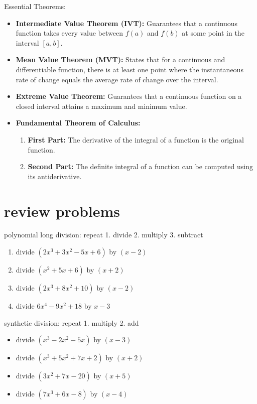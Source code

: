 \documentclass{article}
\begin{document}
Essential Theorems:
\begin{itemize}
    \item \textbf{Intermediate Value Theorem (IVT):} Guarantees that a continuous function takes every value between \( f(a) \) and \( f(b) \) at some point in the interval \([a, b]\).
    \item \textbf{Mean Value Theorem (MVT):} States that for a continuous and differentiable function, there is at least one point where the instantaneous rate of change equals the average rate of change over the interval.
    \item \textbf{Extreme Value Theorem:} Guarantees that a continuous function on a closed interval attains a maximum and minimum value.
    \item \textbf{Fundamental Theorem of Calculus:}
    \begin{enumerate}
        \item \textbf{First Part:} The derivative of the integral of a function is the original function.
        \item \textbf{Second Part:} The definite integral of a function can be computed using its antiderivative.
    \end{enumerate}
\end{itemize}

\newpage
\section*{review problems}

polynomial long division: repeat 1. divide 2. multiply  3. subtract
	\begin{enumerate}
		\item divide $(2x^3+3x^2-5x+6)$ by $(x-2)$
		\item divide $(x^2+5x+6)$ by $(x+2)$ 
		\item divide $(2x^3+8x^2+10)$ by $(x-2)$ 
		\item divide $6x^4-9x^2+18$ by $x-3$ 
	\end{enumerate}

synthetic division: repeat 1. multiply  2. add
	\begin{itemize}
		\item divide $(x^3-2x^2-5x)$ by $(x-3)$
		\item divide $(x^3+5x^2+7x+2)$ by $(x+2)$ 
		\item divide $(3x^2+7x-20)$ by $(x+5)$
		\item divide $(7x^3+6x-8)$ by $(x-4)$ 
	\end{itemize}
\end{document}
